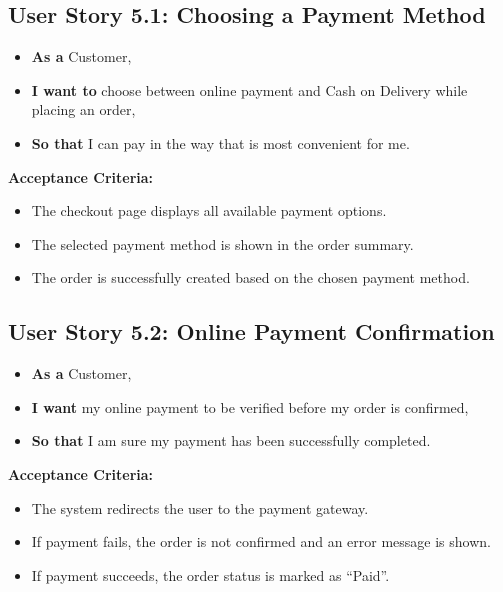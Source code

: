\subsection*{User Story 5.1: Choosing a Payment Method}
\begin{itemize}
    \item \textbf{As a} Customer,
    \item \textbf{I want to} choose between online payment and Cash on Delivery while placing an order,
    \item \textbf{So that} I can pay in the way that is most convenient for me.
\end{itemize}

\noindent\textbf{Acceptance Criteria:}
\begin{itemize}
    \item The checkout page displays all available payment options.
    \item The selected payment method is shown in the order summary.
    \item The order is successfully created based on the chosen payment method.
\end{itemize}

\vspace{1em}
\subsection*{User Story 5.2: Online Payment Confirmation}
\begin{itemize}
    \item \textbf{As a} Customer,
    \item \textbf{I want} my online payment to be verified before my order is confirmed,
    \item \textbf{So that} I am sure my payment has been successfully completed.
\end{itemize}

\noindent\textbf{Acceptance Criteria:}
\begin{itemize}
    \item The system redirects the user to the payment gateway.
    \item If payment fails, the order is not confirmed and an error message is shown.
    \item If payment succeeds, the order status is marked as ``Paid''.
\end{itemize}




